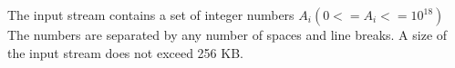 The input stream contains a set of integer numbers $A_{i}(0 <= A_{i} <= 10^{18})$ The numbers are separated by any number of spaces and line breaks. A size of the input stream does not exceed 256 KB.